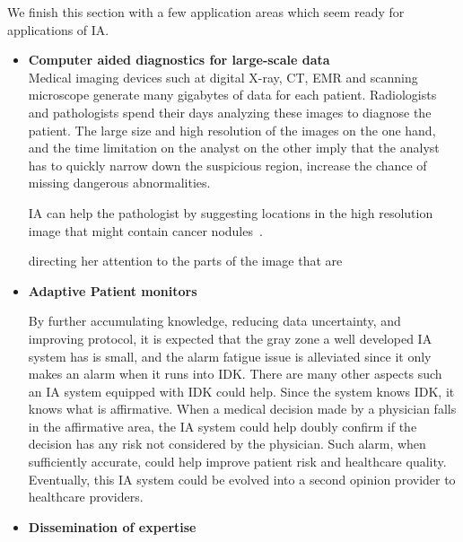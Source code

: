 \documentclass[11pt]{pnas-new}
\begin{document}


  
  We finish this section with a few application areas which seem ready
  for applications of IA.
  
\begin{itemize}
\item{\bf Computer aided diagnostics for large-scale data}\\
  Medical imaging devices such at digital X-ray, CT, EMR and scanning
  microscope generate many gigabytes of data for each
  patient. Radiologists and pathologists spend their days analyzing
  these images to diagnose the patient. The large size and high
  resolution of the images on the one hand, and the time limitation on
  the analyst on the other imply that the analyst has to quickly
  narrow down the suspicious region, increase the chance of missing
  dangerous abnormalities.

  IA can help the pathologist by suggesting locations in the high
  resolution image that might contain cancer nodules~\cite{}.

  directing her attention to the
  parts of the image that are 

\item{\bf Adaptive Patient monitors}

{\color{blue} By further accumulating knowledge, reducing data uncertainty, and improving protocol, it is expected that the gray zone a well developed IA system has is small, and the alarm fatigue issue is alleviated since it only makes an alarm when it runs into IDK. There are many other aspects such an IA system equipped with IDK could help. Since the system knows IDK, it knows what is affirmative. When a medical decision made by a physician falls in the affirmative area, the IA system could help doubly confirm if the decision has any risk not considered by the physician. Such alarm, when sufficiently accurate, could help improve patient risk and healthcare quality. Eventually, this IA system could be evolved into a second opinion provider to healthcare providers. 
}


  
\item {\bf Dissemination of expertise}


\end{itemize}
\end{document}

